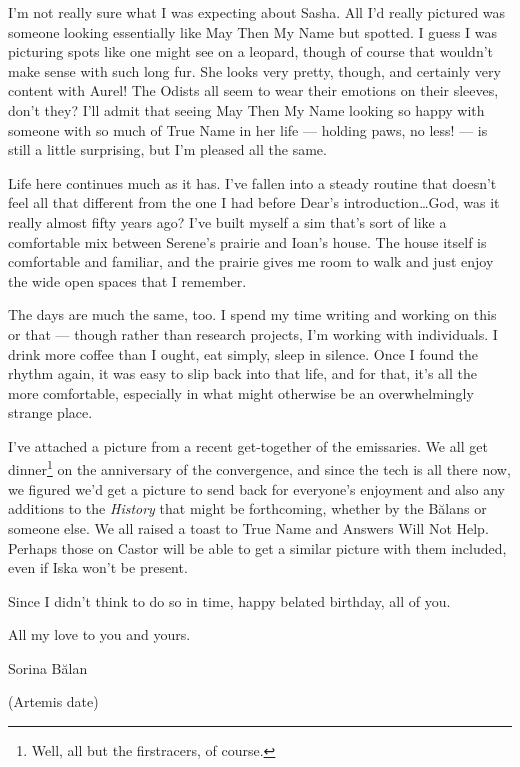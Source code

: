 I'm not really sure what I was expecting about Sasha. All I'd really pictured was someone looking essentially like May Then My Name but spotted. I guess I was picturing spots like one might see on a leopard, though of course that wouldn't make sense with such long fur. She looks very pretty, though, and certainly very content with Aurel! The Odists all seem to wear their emotions on their sleeves, don't they? I'll admit that seeing May Then My Name looking so happy with someone with so much of True Name in her life — holding paws, no less! — is still a little surprising, but I'm pleased all the same.

Life here continues much as it has. I've fallen into a steady routine that doesn't feel all that different from the one I had before Dear's introduction\ldots God, was it really almost fifty years ago? I've built myself a sim that's sort of like a comfortable mix between Serene's prairie and Ioan's house. The house itself is comfortable and familiar, and the prairie gives me room to walk and just enjoy the wide open spaces that I remember.

The days are much the same, too. I spend my time writing and working on this or that — though rather than research projects, I'm working with individuals. I drink more coffee than I ought, eat simply, sleep in silence. Once I found the rhythm again, it was easy to slip back into that life, and for that, it's all the more comfortable, especially in what might otherwise be an overwhelmingly strange place.

I've attached a picture from a recent get-together of the emissaries. We all get dinner\footnote{Well, all but the firstracers, of course.} on the anniversary of the convergence, and since the tech is all there now, we figured we'd get a picture to send back for everyone's enjoyment and also any additions to the \emph{History} that might be forthcoming, whether by the Bălans or someone else. We all raised a toast to True Name and Answers Will Not Help. Perhaps those on Castor will be able to get a similar picture with them included, even if Iska won't be present.

Since I didn't think to do so in time, happy belated birthday, all of you.

All my love to you and yours.

Sorina Bălan

(Artemis date)

